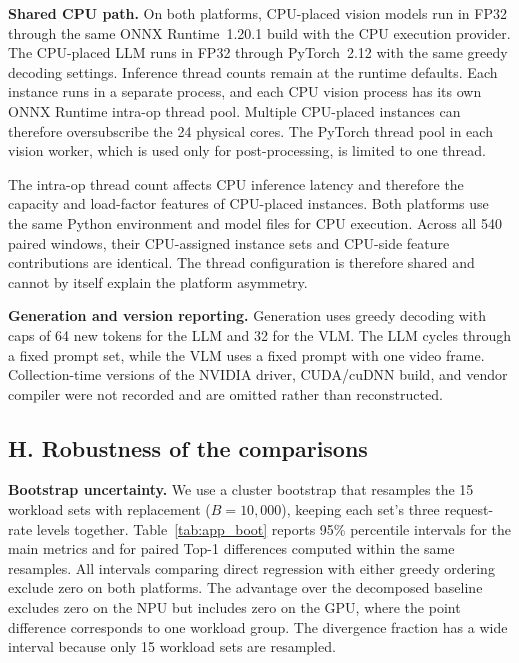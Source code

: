 \documentclass{article}
\begin{document}
\textbf{Shared CPU path.} On both platforms, CPU-placed vision models run in FP32 through the same ONNX Runtime~1.20.1 build with the CPU execution provider. The CPU-placed LLM runs in FP32 through PyTorch~2.12 with the same greedy decoding settings. Inference thread counts remain at the runtime defaults. Each instance runs in a separate process, and each CPU vision process has its own ONNX Runtime intra-op thread pool. Multiple CPU-placed instances can therefore oversubscribe the 24 physical cores. The PyTorch thread pool in each vision worker, which is used only for post-processing, is limited to one thread.

The intra-op thread count affects CPU inference latency and therefore the capacity and load-factor features of CPU-placed instances. Both platforms use the same Python environment and model files for CPU execution. Across all 540 paired windows, their CPU-assigned instance sets and CPU-side feature contributions are identical. The thread configuration is therefore shared and cannot by itself explain the platform asymmetry.

\textbf{Generation and version reporting.} Generation uses greedy decoding with caps of 64 new tokens for the LLM and 32 for the VLM. The LLM cycles through a fixed prompt set, while the VLM uses a fixed prompt with one video frame. Collection-time versions of the NVIDIA driver, CUDA/cuDNN build, and vendor compiler were not recorded and are omitted rather than reconstructed.


\subsection*{H. Robustness of the comparisons}
\textbf{Bootstrap uncertainty.} We use a cluster bootstrap that resamples the 15 workload sets with replacement ($B{=}10{,}000$), keeping each set's three request-rate levels together. Table~\ref{tab:app_boot} reports 95\% percentile intervals for the main metrics and for paired Top-1 differences computed within the same resamples. All intervals comparing direct regression with either greedy ordering exclude zero on both platforms. The advantage over the decomposed baseline excludes zero on the NPU but includes zero on the GPU, where the point difference corresponds to one workload group. The divergence fraction has a wide interval because only 15 workload sets are resampled.
\end{document}
